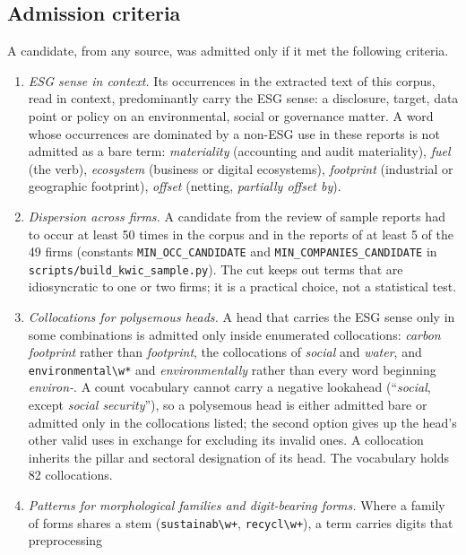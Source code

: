 \subsection{Admission criteria}
\label{sec:lexicon-criteria}

A candidate, from any source, was admitted only if it met the following
criteria.
\begin{enumerate}
\item \emph{ESG sense in context.} Its occurrences in the extracted text of
  this corpus, read in context, predominantly carry the ESG sense: a
  disclosure, target, data point or policy on an environmental, social or
  governance matter. A word whose occurrences are dominated by a non-ESG use
  in these reports is not admitted as a bare term: \emph{materiality}
  (accounting and audit materiality), \emph{fuel} (the verb), \emph{ecosystem}
  (business or digital ecosystems), \emph{footprint} (industrial or
  geographic footprint), \emph{offset} (netting, \emph{partially offset by}).
\item \emph{Dispersion across firms.} A candidate from the review of sample
  reports had to occur at least 50 times in the corpus and in the reports of
  at least 5 of the 49 firms (constants \texttt{MIN\_OCC\_CANDIDATE} and
  \texttt{MIN\_COMPANIES\_CANDIDATE} in
  \nolinkurl{scripts/build_kwic_sample.py}). The cut keeps out terms that are
  idiosyncratic to one or two firms; it is a practical choice, not a
  statistical test.
\item \emph{Collocations for polysemous heads.} A head that carries the ESG
  sense only in some combinations is admitted only inside enumerated
  collocations: \emph{carbon footprint} rather than \emph{footprint}, the
  collocations of \emph{social} and \emph{water}, and
  \texttt{environmental\textbackslash w*} and \emph{environmentally} rather
  than every word beginning \emph{environ-}. A count vocabulary cannot carry
  a negative lookahead (``\emph{social}, except \emph{social security}''), so
  a polysemous head is either admitted bare or admitted only in the
  collocations listed; the second option gives up the head's other valid uses
  in exchange for excluding its invalid ones. A collocation inherits the
  pillar and sectoral designation of its head. The vocabulary holds 82
  collocations.
\item \emph{Patterns for morphological families and digit-bearing forms.}
  Where a family of forms shares a stem (\texttt{sustainab\textbackslash w+},
  \texttt{recycl\textbackslash w+}), a term carries digits that preprocessing

\end{enumerate}
